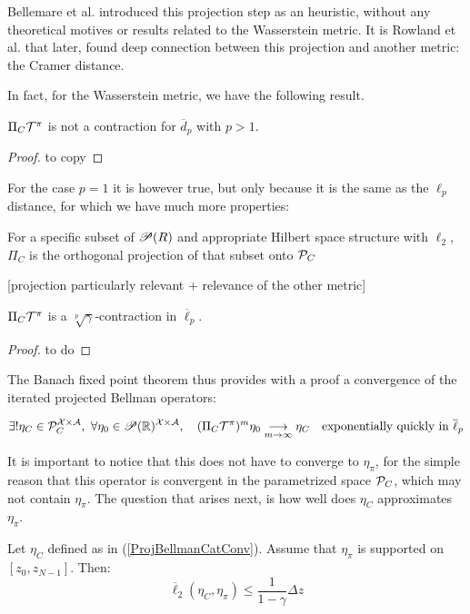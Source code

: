 Bellemare et al. introduced this projection step as an heuristic, without any theoretical motives or results related to the Wasserstein metric. It is Rowland et al. that later, found deep connection between this projection and another metric: the Cramer distance.

In fact, for the Wasserstein metric, we have the following result.
\begin{proposition}
    $\Pi_C\mathcal{T}^\pi$ is not a contraction for $\overline{d}_p$ with $p > 1$.
\end{proposition}
\begin{proof}
    to copy
\end{proof}
For the case $p=1$ it is however true, but only because it is the same as the $\ell_p$ distance, for which we have much more properties:

\begin{proposition}
    For a specific subset of $\mathscr{P}(R)$ and appropriate Hilbert space structure with $\ell_2$, $\Pi_C$ is the orthogonal projection of that subset onto $\mathcal{P}_C$
\end{proposition}
[projection particularly relevant + relevance of the other metric]
\begin{proposition}
    $\Pi_C\mathcal{T}^\pi$ is a $\sqrt[p]\gamma$-contraction in $\overline{\ell}_p$.
\end{proposition}

\begin{proof}
    to do
\end{proof}
The Banach fixed point theorem thus provides with a proof a convergence of the iterated projected Bellman operators:

\begin{equation}\label{ProjBellmanCatConv}
    \exists ! \eta_C \in \mathcal{P}_C^{\mathcal{X} \times \mathcal{A}}, \ \forall \eta_0 \in \mathscr{P}(\mathbb{R})^{\mathcal{X} \times \mathcal{A}},\quad (\Pi_C\mathcal{T}^\pi)^m\eta_0 \underset{m \rightarrow \infty}{\longrightarrow} \eta_C \quad \text{exponentially quickly in } \overline{\ell}_p
\end{equation}


It is important to notice that this does not have to converge to $\eta_\pi$, for the simple reason that this operator is convergent in the parametrized space $\mathcal{P}_C$, which may not contain $\eta_\pi$. The question that arises next, is how well does $\eta_C$ approximates $\eta_\pi$. 

\begin{lemma}
    Let $\eta_C$ defined as in (\ref{ProjBellmanCatConv}). Assume that $\eta_\pi$ is supported on $[z_0, z_{N-1}]$. Then:
    \[ \overline{\ell}_2(\eta_C, \eta_\pi) \leq \frac{1}{1-\gamma} \Delta z \]
\end{lemma}


